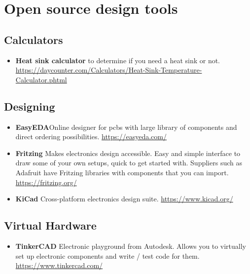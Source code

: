
\chapter{Open source design tools}

\section{Calculators}
\begin{itemize}
    \item \textbf{Heat sink calculator} to determine if you need a heat sink or not. \url{https://daycounter.com/Calculators/Heat-Sink-Temperature-Calculator.phtml} 
\end{itemize}

\section{Designing}
\begin{itemize}
    \item \textbf{EasyEDA}{Online designer for \acp{pcb} with large library of components and direct ordering possibilities. \url{https://easyeda.com/}}
    \item \textbf{Fritzing} Makes electronics design accessible. Easy and simple interface to draw some of your own setups, quick to get started with. Suppliers such as Adafruit have Fritzing libraries with components that you can import. \url{https://fritzing.org/}
    \item \textbf{KiCad} Cross-platform electronics design suite. \url{https://www.kicad.org/}
\end{itemize}

\section{Virtual Hardware}
\begin{itemize}
    \item \textbf{TinkerCAD} Electronic playground from Autodesk. Allows you to virtually set up electronic components and write / test code for them. \url{https://www.tinkercad.com/}
\end{itemize}